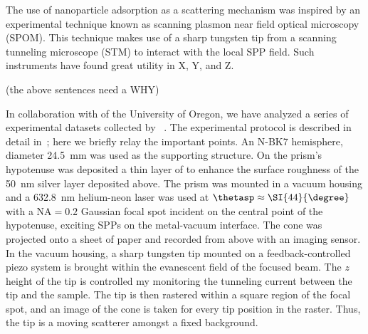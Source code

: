 The use of nanoparticle adsorption as a scattering mechanism was inspired
by an experimental technique known as scanning plasmon near field optical
microscopy (SPOM).  This technique makes use of a sharp tungsten tip from a
scanning tunneling microscope (STM) to interact with the local SPP field.
Such instruments have found great utility in X, Y, and Z.

(the above sentences need a WHY)

In collaboration with  of the University of Oregon, we have
analyzed a series of experimental datasets collected by
~\cite{schumann2009surface}.  The experimental protocol is
described in detail in~\cite{schumann2009surface}; here we briefly relay
the important points.  An N-BK7 hemisphere, diameter
\SI{24.5}{\milli\meter} was used as the supporting structure.  On the
prism's hypotenuse was deposited a thin layer of  to enhance the
surface roughness of the \SI{50}{\nano\meter} silver layer deposited above.
The prism was mounted in a vacuum housing and a \SI{632.8}{\nano\meter}
helium-neon laser was used at $\thetasp\approx\SI{44}{\degree}$ with a
$\mathrm{NA}=0.2$ Gaussian focal spot incident on the central point of the
hypotenuse, exciting SPPs on the metal-vacuum interface.  The cone was
projected onto a sheet of paper and recorded from above with an imaging
sensor.  In the vacuum housing, a sharp tungsten tip mounted on a
feedback-controlled piezo system is brought within the evanescent field of
the focused beam.  The $z$ height of the tip is controlled my monitoring
the tunneling current between the tip and the sample.  The tip is then
rastered within a square region of the focal spot, and an image of the cone
is taken for every tip position in the raster.  Thus, the tip is a moving
scatterer amongst a fixed background.


